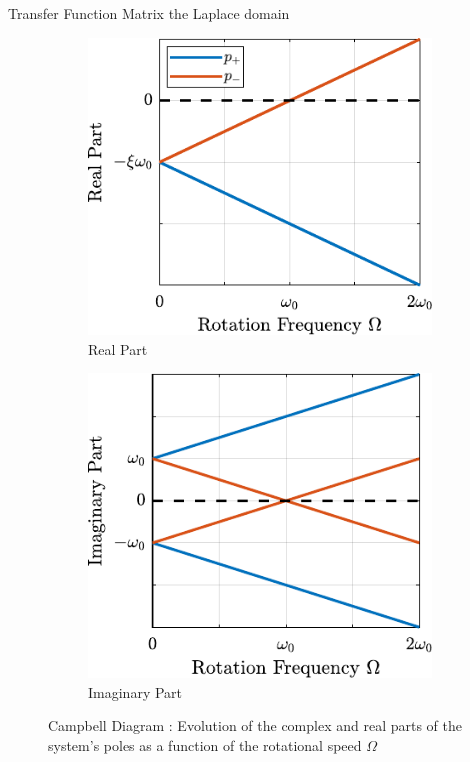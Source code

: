 \documentclass[t, minted]{clean-beamer}
\begin{document}
\begin{frame}[label={sec:org0a25ba1}]{Transfer Function Matrix the Laplace domain}
\vspace{2em}

\begin{figure}[htbp]
\begin{subfigure}[c]{0.49\linewidth}
\includegraphics[width=\linewidth]{figs/campbell_diagram_real.pdf}
\caption{\label{fig:campbell_diagram_real} Real Part}
\end{subfigure}
\hfill
\begin{subfigure}[c]{0.49\linewidth}
\includegraphics[width=\linewidth]{figs/campbell_diagram_imag.pdf}
\caption{\label{fig:campbell_diagram_imag} Imaginary Part}
\end{subfigure}
\hfill
\caption{Campbell Diagram : Evolution of the complex and real parts of the system's poles as a function of the rotational speed \(\Omega\)}
\centering
\end{figure}
\end{frame}
\end{document}
